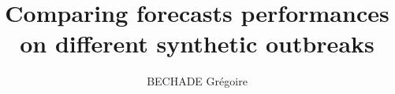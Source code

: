 \documentclass{article}
\title{Comparing forecasts performances on different synthetic outbreaks }
\author{BECHADE Grégoire}
\begin{document}
\maketitle


\begin{abstract}


\end{abstract}








\printbibliography
\end{document}
